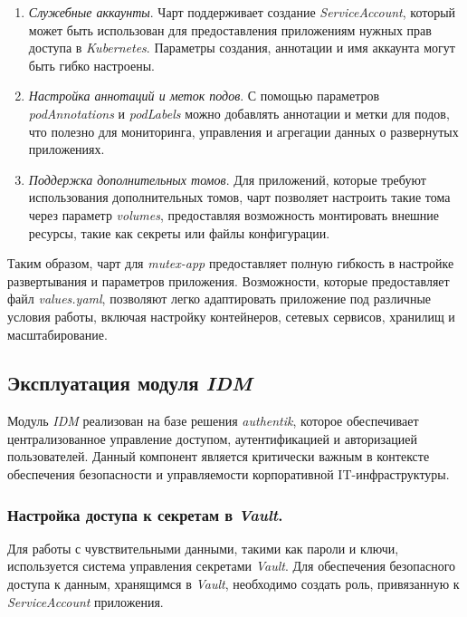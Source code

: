 \begin{enumerate}
    \item \textit{Служебные аккаунты}. Чарт поддерживает создание \textit{ServiceAccount}, который может быть использован для предоставления приложениям нужных прав доступа в \textit{Kubernetes}. Параметры создания, аннотации и имя аккаунта могут быть гибко настроены.

    \item \textit{Настройка аннотаций и меток подов}. С помощью параметров \textit{podAnnotations} и \textit{podLabels} можно добавлять аннотации и метки для подов, что полезно для мониторинга, управления и агрегации данных о развернутых приложениях.

    \item \textit{Поддержка дополнительных томов}. Для приложений, которые требуют использования дополнительных томов, чарт позволяет настроить такие тома через параметр \textit{volumes}, предоставляя возможность монтировать внешние ресурсы, такие как секреты или файлы конфигурации.

\end{enumerate}

Таким образом, чарт для \textit{mutex-app} предоставляет полную гибкость в настройке развертывания и параметров приложения. Возможности, которые предоставляет файл \textit{values.yaml}, позволяют легко адаптировать приложение под различные условия работы, включая настройку контейнеров, сетевых сервисов, хранилищ и масштабирование.



\subsection{Эксплуатация модуля \textit{IDM}}

Модуль \textit{IDM} реализован на базе решения \textit{authentik}, которое обеспечивает централизованное управление доступом, аутентификацией и авторизацией пользователей. Данный компонент является критически важным в контексте обеспечения безопасности и управляемости корпоративной IT-инфраструктуры.

\subsubsection{Настройка доступа к секретам в \textit{Vault}.} Для работы с чувствительными данными, такими как пароли и ключи, используется система управления секретами \textit{Vault}. Для обеспечения безопасного доступа к данным, хранящимся в \textit{Vault}, необходимо создать роль, привязанную к \textit{ServiceAccount} приложения.

